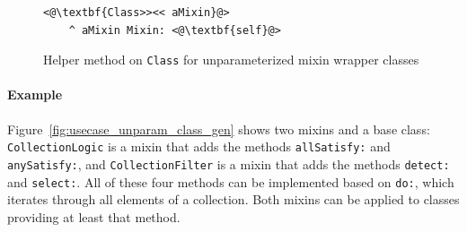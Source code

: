 \begin{figure}[!htp]
\begin{lstlisting}
<@\textbf{Class>><< aMixin}@>
    ^ aMixin Mixin: <@\textbf{self}@>
\end{lstlisting}
\caption[Helper method for unparameterized class generator pattern]{Helper method on \texttt{Class} for unparameterized mixin wrapper classes}
\label{fig:usecase_class_lele}
\end{figure}

\paragraph{Example}
Figure~\ref{fig:usecase_unparam_class_gen} shows two mixins and a base class: \texttt{CollectionLogic} is a mixin that adds the methods \texttt{allSatisfy:} and \texttt{anySatisfy:}, and \texttt{CollectionFilter} is a mixin that adds the methods \texttt{detect:} and \texttt{select:}. All of these four methods can be implemented based on \texttt{do:}, which iterates through all elements of a collection. Both mixins can be applied to classes providing at least that method. %

